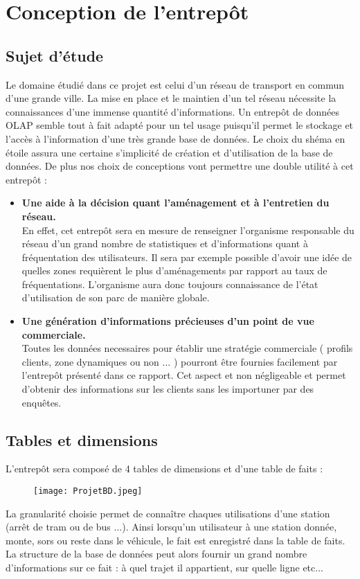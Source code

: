 \chapter{Conception de l'entrepôt}
\section{Sujet d'étude}
Le domaine étudié dans ce projet est celui d'un réseau de transport en commun d'une grande ville.
La mise en place et le maintien d'un tel réseau nécessite la connaissances d'une immense quantité d'informations.
Un entrepôt de données OLAP semble tout à fait adapté pour un tel usage puisqu'il permet le stockage et l'accès à l'information d'une très grande base de données.
Le choix du shéma en étoile assura une certaine s'implicité de création et d'utilisation de la base de données.
De plus nos choix de conceptions vont permettre une double utilité à cet entrepôt :

\begin{itemize}
  \item 
    \textbf{Une aide à la décision quant l'aménagement et à l'entretien du réseau.}\\
  En effet, cet entrepôt sera en mesure de renseigner l'organisme responsable du réseau d'un grand nombre de  statistiques et d'informations quant à fréquentation des utilisateurs.
  Il sera par exemple possible d'avoir une idée de quelles zones requièrent le plus d'aménagements par rapport au taux de fréquentations.
  L'organisme aura donc toujours connaissance de l'état d'utilisation de son parc de manière globale.
  \item	
  \textbf{Une génération d'informations précieuses d'un point de vue commerciale.}\\
    Toutes les données necessaires pour établir une stratégie commerciale ( profils clients, zone dynamiques ou non ... ) pourront être fournies facilement par l'entrepôt présenté dans ce rapport.  
    Cet aspect et non négligeable et permet d'obtenir des informations sur les clients sans les importuner par des enquêtes.
\end{itemize}


\clearpage
 
\section{Tables et dimensions}
L'entrepôt sera composé de 4 tables de dimensions et d'une table de faits : 
\begin{figure}[!h] 
\centering
  \texttt{[image: ProjetBD.jpeg]}
\end{figure} 

La granularité choisie permet de connaître chaques utilisations d'une station (arrêt de tram ou de bus ...).
Ainsi lorsqu'un utilisateur à une station donnée, monte, sors ou reste dans le véhicule, le fait est enregistré dans la table de faits. 
La structure de la base de données peut alors fournir un grand nombre d'informations sur ce fait : à quel trajet il appartient, sur quelle ligne etc...

